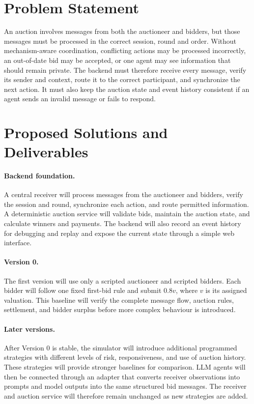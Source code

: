 \documentclass[11pt,a4paper]{article}
\begin{document}
\section{Problem Statement}
An auction involves messages from both the auctioneer and bidders, but those messages must be processed in the correct session, round and order. Without mechanism-aware coordination, conflicting actions may be processed incorrectly, an out-of-date bid may be accepted, or one agent may see information that should remain private. The backend must therefore receive every message, verify its sender and context, route it to the correct participant, and synchronize the next action. It must also keep the auction state and event history consistent if an agent sends an invalid message or fails to respond.

\section{Proposed Solutions and Deliverables}
\paragraph{Backend foundation.} A central receiver will process messages from the auctioneer and bidders, verify the session and round, synchronize each action, and route permitted information. A deterministic auction service will validate bids, maintain the auction state, and calculate winners and payments. The backend will also record an event history for debugging and replay and expose the current state through a simple web interface.

\paragraph{Version 0.} The first version will use only a scripted auctioneer and scripted bidders. Each bidder will follow one fixed first-bid rule and submit $0.8v$, where $v$ is its assigned valuation. This baseline will verify the complete message flow, auction rules, settlement, and bidder surplus before more complex behaviour is introduced.

\paragraph{Later versions.} After Version 0 is stable, the simulator will introduce additional programmed strategies with different levels of risk, responsiveness, and use of auction history. These strategies will provide stronger baselines for comparison. LLM agents will then be connected through an adapter that converts receiver observations into prompts and model outputs into the same structured bid messages. The receiver and auction service will therefore remain unchanged as new strategies are added.
\end{document}
